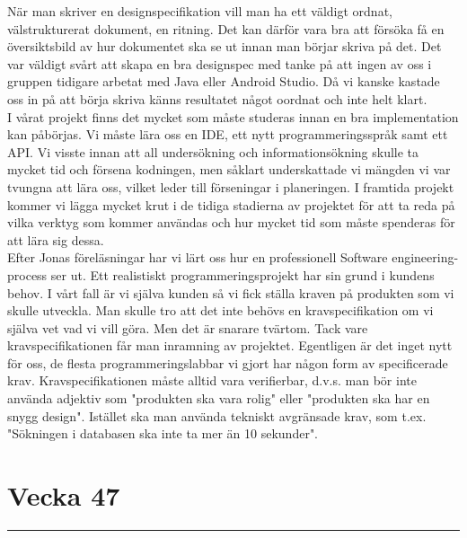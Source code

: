 \documentclass{article}
\newcommand{\HRule}{\rule{\linewidth}{0.5mm}}
\begin{document}
När man skriver en designspecifikation vill man ha ett väldigt ordnat, välstrukturerat dokument, en ritning.
Det kan därför vara bra att försöka få en översiktsbild av hur dokumentet ska se ut innan man börjar skriva på det.
Det var väldigt svårt att skapa en bra designspec med tanke på att ingen av oss i gruppen tidigare arbetat med Java eller Android Studio.
Då vi kanske kastade oss in på att börja skriva känns resultatet något oordnat och inte helt klart.
\\
I vårat projekt finns det mycket som måste studeras innan en bra implementation kan påbörjas. Vi måste lära oss en IDE, ett
nytt programmeringsspråk samt ett API. Vi visste innan att all undersökning och informationsökning skulle ta mycket tid och försena
kodningen, men såklart underskattade vi mängden vi var tvungna att lära oss, vilket leder till förseningar i planeringen.
I framtida projekt kommer vi lägga mycket krut i de tidiga stadierna av projektet för att ta reda på vilka verktyg som kommer
användas och hur mycket tid som måste spenderas för att lära sig dessa.
\\
Efter Jonas föreläsningar har vi lärt oss hur en professionell Software engineering-process ser ut.
Ett realistiskt programmeringsprojekt har sin grund i kundens behov. I vårt fall är vi själva kunden så vi fick ställa kraven på produkten som vi skulle utveckla.
Man skulle tro att det inte behövs en kravspecifikation om vi själva vet vad vi vill göra. Men det är snarare tvärtom. 
Tack vare kravspecifikationen får man inramning av projektet.
Egentligen är det inget nytt för oss, de flesta programmeringslabbar vi gjort har någon form av specificerade krav.
Kravspecifikationen måste alltid vara verifierbar, d.v.s. man bör inte använda adjektiv som "produkten ska vara rolig" eller "produkten ska har en snygg design". 
Istället ska man använda tekniskt avgränsade krav, som t.ex. "Sökningen i databasen ska inte ta mer än 10 sekunder".
\\

\newpage{}

\section*{ {\center Vecka 47} }
\HRule \\[2 cm]
\end{document}

